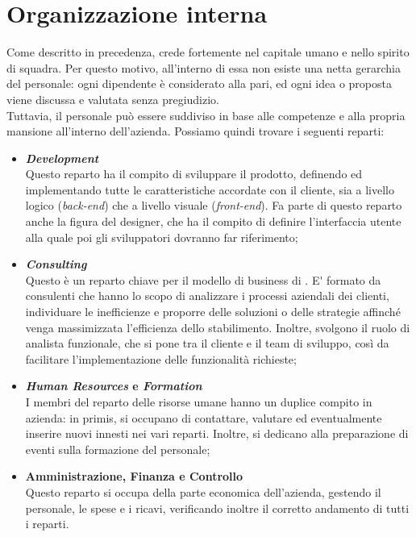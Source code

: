 \section{Organizzazione interna}
Come descritto in precedenza, \AD{} crede fortemente nel capitale umano e nello spirito di squadra. Per questo motivo, all'interno di essa non esiste una netta gerarchia del personale: ogni dipendente è considerato alla pari, ed ogni idea o proposta viene discussa e valutata senza pregiudizio. \\
Tuttavia, il personale può essere suddiviso in base alle competenze e alla propria mansione all'interno dell'azienda. Possiamo quindi trovare i seguenti reparti:
\begin{itemize}
\item \textbf{\textit{Development}}\\
Questo reparto ha il compito di sviluppare il prodotto, definendo ed implementando tutte le caratteristiche accordate con il cliente, sia a livello logico (\textit{back-end}) che a livello visuale (\textit{front-end}). Fa parte di questo reparto anche la figura del designer, che ha il compito di definire l'interfaccia utente alla quale poi gli sviluppatori dovranno far riferimento;  
\item \textbf{\textit{Consulting}}\\
Questo è un reparto chiave per il modello di business di \AD{}. E\'{} formato da consulenti che hanno lo scopo di analizzare i processi aziendali dei clienti, individuare le inefficienze e proporre delle soluzioni o delle strategie affinché venga massimizzata l'efficienza dello stabilimento. Inoltre, svolgono il ruolo di analista funzionale, che si pone tra il cliente e il team di sviluppo, così da facilitare l'implementazione delle funzionalità richieste;
\item \textbf{\textit{Human Resources} e \textit{Formation}}\\
I membri del reparto delle risorse umane hanno un duplice compito in azienda: in primis, si occupano di contattare, valutare ed eventualmente inserire nuovi innesti nei vari reparti. Inoltre, si dedicano alla preparazione di eventi sulla formazione del personale;
\item \textbf{Amministrazione, Finanza e Controllo}\\
Questo reparto si occupa della parte economica dell'azienda, gestendo il personale, le spese e i ricavi, verificando inoltre il corretto andamento di tutti i reparti.
\end{itemize}

